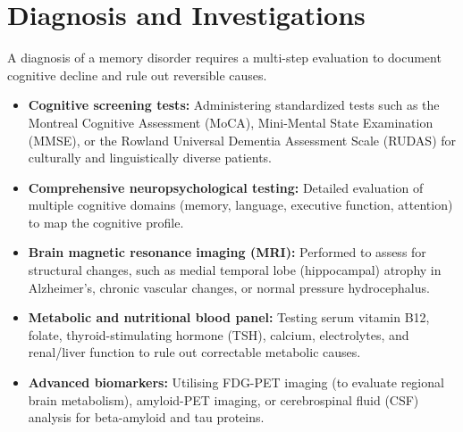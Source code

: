 \section*{Diagnosis and Investigations}
A diagnosis of a memory disorder requires a multi-step evaluation to document cognitive decline and rule out reversible causes.
\begin{itemize}
    \item \textbf{Cognitive screening tests:} Administering standardized tests such as the Montreal Cognitive Assessment (MoCA), Mini-Mental State Examination (MMSE), or the Rowland Universal Dementia Assessment Scale (RUDAS) for culturally and linguistically diverse patients.
    \item \textbf{Comprehensive neuropsychological testing:} Detailed evaluation of multiple cognitive domains (memory, language, executive function, attention) to map the cognitive profile.
    \item \textbf{Brain magnetic resonance imaging (MRI):} Performed to assess for structural changes, such as medial temporal lobe (hippocampal) atrophy in Alzheimer's, chronic vascular changes, or normal pressure hydrocephalus.
    \item \textbf{Metabolic and nutritional blood panel:} Testing serum vitamin B12, folate, thyroid-stimulating hormone (TSH), calcium, electrolytes, and renal/liver function to rule out correctable metabolic causes.
    \item \textbf{Advanced biomarkers:} Utilising FDG-PET imaging (to evaluate regional brain metabolism), amyloid-PET imaging, or cerebrospinal fluid (CSF) analysis for beta-amyloid and tau proteins.
\end{itemize}

